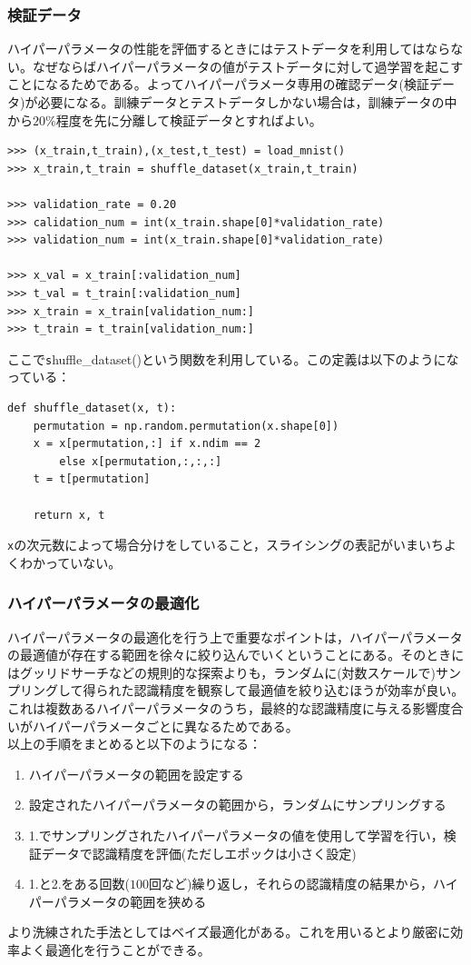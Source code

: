 \documentclass{jarticle}
\begin{document}
\subsubsection{検証データ}
ハイパーパラメータの性能を評価するときにはテストデータを利用してはならない。なぜならばハイパーパラメータの値がテストデータに対して過学習を起こすことになるためである。よってハイパーパラメータ専用の確認データ(検証データ)が必要になる。訓練データとテストデータしかない場合は，訓練データの中から$20\%$程度を先に分離して検証データとすればよい。
\begin{lstlisting}
>>> (x_train,t_train),(x_test,t_test) = load_mnist()
>>> x_train,t_train = shuffle_dataset(x_train,t_train)

>>> validation_rate = 0.20
>>> calidation_num = int(x_train.shape[0]*validation_rate)
>>> validation_num = int(x_train.shape[0]*validation_rate)

>>> x_val = x_train[:validation_num]
>>> t_val = t_train[:validation_num]
>>> x_train = x_train[validation_num:]
>>> t_train = t_train[validation_num:]
\end{lstlisting}
ここで{\texttt shuffle\_dataset()}という関数を利用している。この定義は以下のようになっている：
\begin{lstlisting}
def shuffle_dataset(x, t):
    permutation = np.random.permutation(x.shape[0])
    x = x[permutation,:] if x.ndim == 2 
    	else x[permutation,:,:,:]
    t = t[permutation]

    return x, t
\end{lstlisting}
{\texttt x}の次元数によって場合分けをしていること，スライシングの表記がいまいちよくわかっていない。
\subsubsection{ハイパーパラメータの最適化}
ハイパーパラメータの最適化を行う上で重要なポイントは，ハイパーパラメータの最適値が存在する範囲を徐々に絞り込んでいくということにある。そのときにはグッリドサーチなどの規則的な探索よりも，ランダムに(対数スケールで)サンプリングして得られた認識精度を観察して最適値を絞り込むほうが効率が良い。これは複数あるハイパーパラメータのうち，最終的な認識精度に与える影響度合いがハイパーパラメータごとに異なるためである。\\
以上の手順をまとめると以下のようになる：
\begin{enumerate}
\item ハイパーパラメータの範囲を設定する
\item 設定されたハイパーパラメータの範囲から，ランダムにサンプリングする
\item 1.でサンプリングされたハイパーパラメータの値を使用して学習を行い，検証データで認識精度を評価(ただしエポックは小さく設定)
\item 1.と2.をある回数($100$回など)繰り返し，それらの認識精度の結果から，ハイパーパラメータの範囲を狭める
\end{enumerate}
より洗練された手法としてはベイズ最適化がある。これを用いるとより厳密に効率よく最適化を行うことができる。
\end{document}
